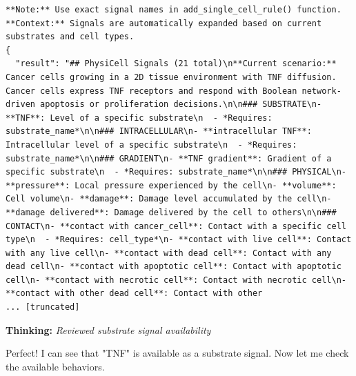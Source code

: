 \documentclass[11pt,a4paper]{article}
\begin{document}
\begin{toolokbox}
\begin{lstlisting}
**Note:** Use exact signal names in add_single_cell_rule() function.
**Context:** Signals are automatically expanded based on current substrates and cell types.
{
  "result": "## PhysiCell Signals (21 total)\n**Current scenario:** Cancer cells growing in a 2D tissue environment with TNF diffusion. Cancer cells express TNF receptors and respond with Boolean network-driven apoptosis or proliferation decisions.\n\n### SUBSTRATE\n- **TNF**: Level of a specific substrate\n  - *Requires: substrate_name*\n\n### INTRACELLULAR\n- **intracellular TNF**: Intracellular level of a specific substrate\n  - *Requires: substrate_name*\n\n### GRADIENT\n- **TNF gradient**: Gradient of a specific substrate\n  - *Requires: substrate_name*\n\n### PHYSICAL\n- **pressure**: Local pressure experienced by the cell\n- **volume**: Cell volume\n- **damage**: Damage level accumulated by the cell\n- **damage delivered**: Damage delivered by the cell to others\n\n### CONTACT\n- **contact with cancer_cell**: Contact with a specific cell type\n  - *Requires: cell_type*\n- **contact with live cell**: Contact with any live cell\n- **contact with dead cell**: Contact with any dead cell\n- **contact with apoptotic cell**: Contact with apoptotic cell\n- **contact with necrotic cell**: Contact with necrotic cell\n- **contact with other dead cell**: Contact with other
... [truncated]
\end{lstlisting}
\end{toolokbox}
\begin{thinkbox}
\textbf{Thinking:} \textit{Reviewed substrate signal availability}

Perfect! I can see that "TNF" is available as a substrate signal. Now let me check the available behaviors.

\end{thinkbox}
\end{document}
